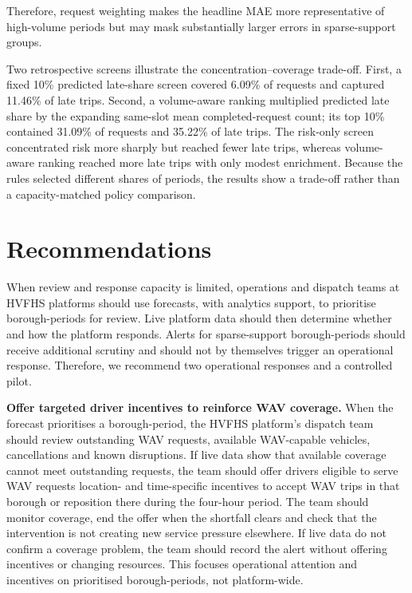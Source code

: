 \documentclass[11pt]{article}
\begin{document}
Therefore, request weighting makes the headline MAE more representative of high-volume
periods but may mask substantially larger errors in sparse-support groups.

Two retrospective screens illustrate the concentration--coverage trade-off. First,
a fixed 10\% predicted late-share screen covered 6.09\% of requests and captured
11.46\% of late trips. Second, a volume-aware ranking multiplied predicted late
share by the expanding same-slot mean completed-request count; its top 10\% contained
31.09\% of requests and 35.22\% of late trips. The risk-only screen concentrated
risk more sharply but reached fewer late trips, whereas volume-aware ranking reached
more late trips with only modest enrichment. Because the rules selected different
shares of periods, the results show a trade-off rather than a capacity-matched policy
comparison.

\FloatBarrier

\section{Recommendations}
When review and response capacity is limited, operations and dispatch teams at HVFHS platforms should use
forecasts, with analytics support, to prioritise borough-periods for review. Live platform data should
then determine whether and how the platform responds. Alerts for sparse-support
borough-periods should receive additional scrutiny and should not by themselves trigger an
operational response. Therefore, we recommend two operational responses and a controlled pilot.

\textbf{Offer targeted driver incentives to reinforce WAV coverage.}
When the forecast prioritises a borough-period, the HVFHS platform's dispatch team should review
outstanding WAV requests, available WAV-capable vehicles, cancellations and known disruptions.
If live data show that available coverage cannot meet outstanding requests, the team should
offer drivers eligible to serve WAV requests location- and time-specific incentives to accept
WAV trips in that borough or reposition there during the four-hour period. The team should
monitor coverage, end the offer when the shortfall clears and check that the intervention
is not creating new service pressure elsewhere. If live data do not confirm a coverage problem,
the team should record the alert without offering incentives or changing resources. This
focuses operational attention and incentives on prioritised borough-periods, not platform-wide.
\end{document}
